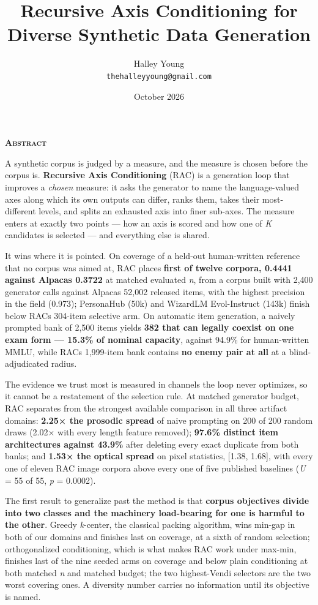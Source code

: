 \documentclass[
  10pt,
]{article}
\title{Recursive Axis Conditioning for Diverse Synthetic Data
Generation}
\author{Halley Young\\[0.2em]{\normalsize\texttt{thehalleyyoung@gmail.com}}}
\date{October 2026}
\theoremstyle{plain}
\theoremstyle{definition}
\newenvironment{iclrabstract}
  {\vspace{0.4em}\begin{center}{\bfseries\scshape Abstract}\end{center}
   \begin{list}{}{\setlength{\leftmargin}{0.45in}\setlength{\rightmargin}{0.45in}}\item[]\relax}
  {\end{list}\vspace{0.6em}}
\begin{document}
\maketitle

\begin{iclrabstract}

A synthetic corpus is judged by a measure, and the measure is chosen
before the corpus is. \textbf{Recursive Axis Conditioning} (RAC) is a
generation loop that improves a \emph{chosen} measure: it asks the
generator to name the language-valued axes along which its own outputs
can differ, ranks them, takes their most-different levels, and splits an
exhausted axis into finer sub-axes. The measure enters at exactly two
points --- how an axis is scored and how one of \emph{K} candidates is
selected --- and everything else is shared.

It wins where it is pointed. On coverage of a held-out human-written
reference that no corpus was aimed at, RAC places \textbf{first of
twelve corpora, 0.4441 against Alpaca\textquotesingle s 0.3722} at
matched evaluated \emph{n}, from a corpus built with 2,400 generator
calls against Alpaca\textquotesingle s 52,002 released items, with the
highest precision in the field (0.973); PersonaHub (50k) and WizardLM
Evol-Instruct (143k) finish below RAC\textquotesingle s 304-item
selective arm. On automatic item generation, a naively prompted bank of
2,500 items yields \textbf{382 that can legally coexist on one exam form
--- 15.3\% of nominal capacity}, against 94.9\% for human-written MMLU,
while RAC\textquotesingle s 1,999-item bank contains \textbf{no enemy
pair at all} at a blind-adjudicated radius.

The evidence we trust most is measured in channels the loop never
optimizes, so it cannot be a restatement of the selection rule. At
matched generator budget, RAC separates from the strongest available
comparison in all three artifact domains: \textbf{2.25× the prosodic
spread} of naive prompting on 200 of 200 random draws (2.02× with every
length feature removed); \textbf{97.6\% distinct item architectures
against 43.9\%} after deleting every exact duplicate from both banks;
and \textbf{1.53× the optical spread} on pixel statistics, {[}1.38,
1.68{]}, with every one of eleven RAC image corpora above every one of
five published baselines (\emph{U} = 55 of 55, \emph{p} = 0.0002).

The first result to generalize past the method is that \textbf{corpus
objectives divide into two classes and the machinery load-bearing for
one is harmful to the other}. Greedy \emph{k}-center, the classical
packing algorithm, wins min-gap in both of our domains and finishes last
on coverage, at a sixth of random selection; orthogonalized
conditioning, which is what makes RAC work under max-min, finishes last
of the nine seeded arms on coverage and below plain conditioning at both
matched \emph{n} and matched budget; the two highest-Vendi selectors are
the two worst covering ones. A diversity number carries no information
until its objective is named.


\end{iclrabstract}
\end{document}
